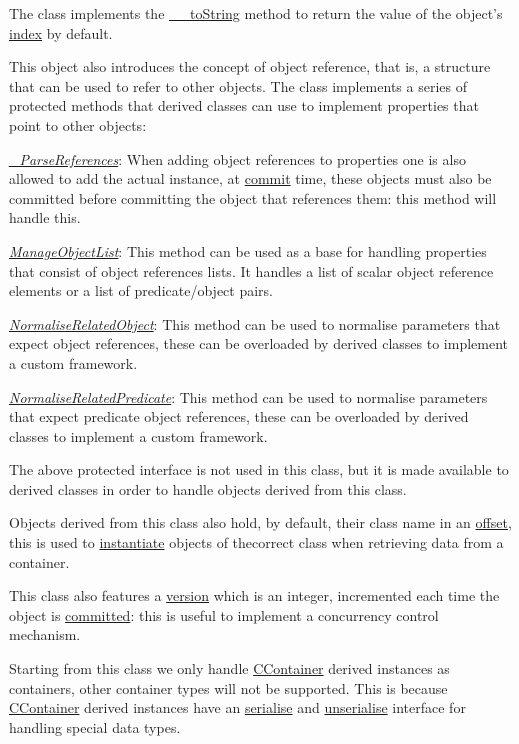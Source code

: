 The class implements the \hyperlink{}{\-\_\-\-\_\-to\-String} method to return the value of the object's \hyperlink{}{index} by default.

This object also introduces the concept of object reference, that is, a structure that can be used to refer to other objects. The class implements a series of protected methods that derived classes can use to implement properties that point to other objects\-:


\begin{DoxyItemize}
\item {\itshape \hyperlink{}{\-\_\-\-Parse\-References}}\-: When adding object references to properties one is also allowed to add the actual instance, at \hyperlink{}{commit} time, these objects must also be committed before committing the object that references them\-: this method will handle this. 
\item {\itshape \hyperlink{class_c_attribute_a58d5de30d4a6ea29f485a266460a2bdd}{Manage\-Object\-List}}\-: This method can be used as a base for handling properties that consist of object references lists. It handles a list of scalar object reference elements or a list of predicate/object pairs. 
\item {\itshape \hyperlink{}{Normalise\-Related\-Object}}\-: This method can be used to normalise parameters that expect object references, these can be overloaded by derived classes to implement a custom framework. 
\item {\itshape \hyperlink{}{Normalise\-Related\-Predicate}}\-: This method can be used to normalise parameters that expect predicate object references, these can be overloaded by derived classes to implement a custom framework. 
\end{DoxyItemize}

The above protected interface is not used in this class, but it is made available to derived classes in order to handle objects derived from this class.

Objects derived from this class also hold, by default, their class name in an \hyperlink{}{offset}, this is used to \hyperlink{}{instantiate} objects of thecorrect class when retrieving data from a container.

This class also features a \hyperlink{}{version} which is an integer, incremented each time the object is \hyperlink{}{committed}\-: this is useful to implement a concurrency control mechanism.

Starting from this class we only handle \hyperlink{class_c_container}{C\-Container} derived instances as containers, other container types will not be supported. This is because \hyperlink{class_c_container}{C\-Container} derived instances have an \hyperlink{class_c_data_type_a608d6fc184bce537ce83669f729d6008}{serialise} and \hyperlink{}{unserialise} interface for handling special data types.

